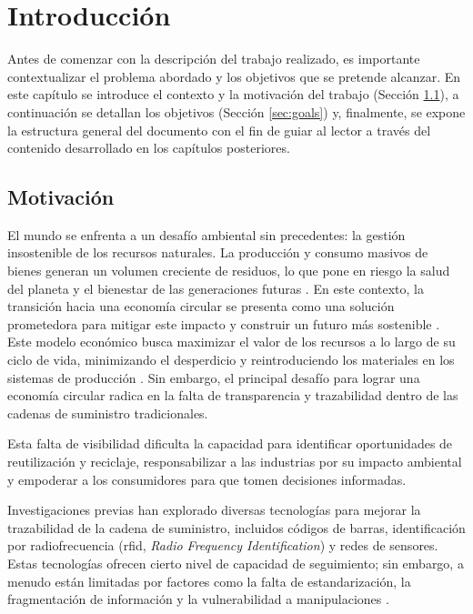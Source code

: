 \chapter[Introducción]{Introducción}
\label{cp:introduction}

\parindent0pt

Antes de comenzar con la descripción del trabajo realizado, es importante contextualizar el problema abordado y los objetivos que se pretende alcanzar. En este capítulo se introduce el contexto y la motivación del trabajo (Sección \ref{sec:motivation}), a continuación se detallan los objetivos (Sección \ref{sec:goals}) y, finalmente, se expone la estructura general del documento con el fin de guiar al lector a través del contenido desarrollado en los capítulos posteriores.

\section{Motivación}
\label{sec:motivation}

El mundo se enfrenta a un desafío ambiental sin precedentes: la gestión insostenible de los recursos naturales. La producción y consumo masivos de bienes generan un volumen creciente de residuos, lo que pone en riesgo la salud del planeta y el bienestar de las generaciones futuras \cite{IPCC2022, pelegri2021ipcc}. En este contexto, la transición hacia una economía circular se presenta como una solución prometedora para mitigar este impacto y construir un futuro más sostenible \cite{clima2022book}. Este modelo económico busca maximizar el valor de los recursos a lo largo de su ciclo de vida, minimizando el desperdicio y reintroduciendo los materiales en los sistemas de producción \cite{da2022economia, melendez2021economia}. Sin embargo, el principal desafío para lograr una economía circular radica en la falta de transparencia y trazabilidad dentro de las cadenas de suministro tradicionales.

Esta falta de visibilidad dificulta la capacidad para identificar oportunidades de reutilización y reciclaje, responsabilizar a las industrias por su impacto ambiental y empoderar a los consumidores para que tomen decisiones informadas. 

Investigaciones previas han explorado diversas tecnologías para mejorar la trazabilidad de la cadena de suministro, incluidos códigos de barras, identificación por radiofrecuencia (\gls{rfid}, \textit{Radio Frequency Identification}) y redes de sensores. Estas tecnologías ofrecen cierto nivel de capacidad de seguimiento; sin embargo, a menudo están limitadas por factores como la falta de estandarización, la fragmentación de información y la vulnerabilidad a manipulaciones \cite{schuitemaker2020product}.

